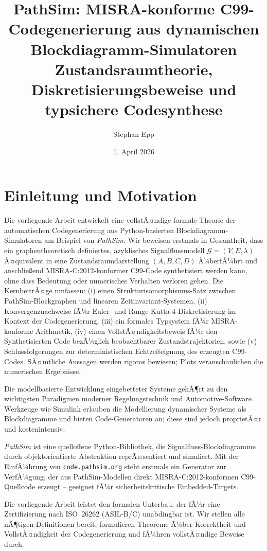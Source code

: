 ﻿\documentclass[12pt,a4paper]{article}
\title{
	\textbf{PathSim: MISRA-konforme C99-Codegenerierung aus dynamischen Blockdiagramm-Simulatoren}\\{\large Zustandsraumtheorie, Diskretisierungsbeweise und typsichere Code\-synthese}
}
\author{Stephan Epp}
\date{1. April 2026}
\theoremstyle{definition}
\begin{document}
\maketitle
\tableofcontents
\newpage


\section{Einleitung und Motivation}

Die vorliegende Arbeit entwickelt eine vollstÃ¤ndige formale Theorie der automatischen
Codegenerierung aus Python-basierten Blockdiagramm-Simulatoren am Beispiel von
\emph{PathSim}. Wir beweisen erstmals in Gesamtheit, dass ein graphentheoretisch
definiertes, azyklisches Signalflussmodell $\mathcal{G}=(V,E,\lambda)$ Ã¤quivalent
in eine Zustandsraumdarstellung $(A,B,C,D)$ Ã¼berfÃ¼hrt und anschlie\ss{}end
MISRA-C:2012-konformer C99-Code synthetisiert werden kann, ohne dass Bedeutung
oder numerisches Verhalten verloren gehen. Die KernbeitrÃ¤ge umfassen:
(i) einen Strukturisomorphismus-Satz zwischen PathSim-Blockgraphen und linearen
Zeitinvariant-Systemen,
(ii) Konvergenznachweise fÃ¼r Euler- und Runge-Kutta-4-Diskretisierung im
Kontext der Code\-generierung,
(iii) ein formales Typsystem fÃ¼r MISRA-konforme Arithmetik,
(iv) einen VollstÃ¤ndigkeitsbeweis fÃ¼r den Synthetisierten Code bezÃ¼glich
beobachtbarer Zustandstrajektorien, sowie
(v) Schlussfolgerungen zur deterministischen Echtzeiteignung des erzeugten C99-Codes.
SÃ¤mtliche Aussagen werden rigoros bewiesen; Plots veranschaulichen die
numerischen Ergebnisse.

Die modellbasierte Entwicklung eingebetteter Systeme gehÃ¶rt zu den wichtigsten
Paradigmen moderner Regelungstechnik und Automotive-Software. Werkzeuge wie
Simulink erlauben die Modellierung dynamischer Systeme als Blockdiagramme und
bieten Code-Generatoren an; diese sind jedoch proprietÃ¤r und kostenintensiv.

\emph{PathSim} \cite{pathsim2024} ist eine quelloffene Python-Bibliothek, die
Signalfluss-Blockdiagramme durch objektorientierte Abstraktion reprÃ¤sentiert
und simuliert. Mit der EinfÃ¼hrung von \texttt{code.pathsim.org} steht erstmals
ein Generator zur VerfÃ¼gung, der aus PathSim-Modellen direkt MISRA-C:2012-konformen
C99-Quellcode erzeugt -- geeignet fÃ¼r sicherheitskritische Embedded-Targets.

Die vorliegende Arbeit leistet den formalen Unterbau, der fÃ¼r eine Zertifizierung
nach ISO~26262 (ASIL-B/C) unabdingbar ist. Wir stellen alle nÃ¶tigen Definitionen
bereit, formulieren Theoreme Ã¼ber Korrektheit und VollstÃ¤ndigkeit der
Code\-generierung und fÃ¼hren vollstÃ¤ndige Beweise durch.
\end{document}
